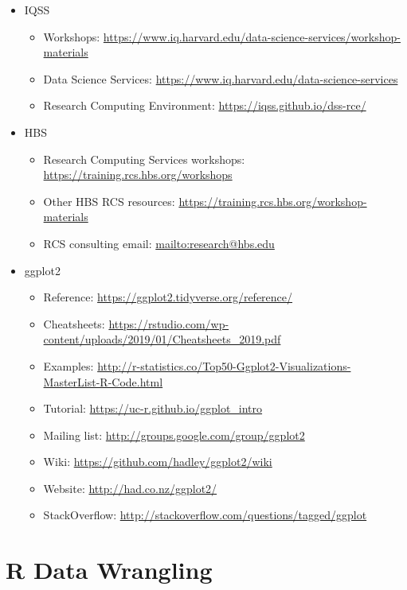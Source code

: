 \documentclass[
]{book}
\providecommand{\tightlist}{%
  \setlength{\itemsep}{0pt}\setlength{\parskip}{0pt}}
\begin{document}
\begin{itemize}
\tightlist
\item
  IQSS

  \begin{itemize}
  \tightlist
  \item
    Workshops: \url{https://www.iq.harvard.edu/data-science-services/workshop-materials}
  \item
    Data Science Services: \url{https://www.iq.harvard.edu/data-science-services}
  \item
    Research Computing Environment: \url{https://iqss.github.io/dss-rce/}
  \end{itemize}
\item
  HBS

  \begin{itemize}
  \tightlist
  \item
    Research Computing Services workshops: \url{https://training.rcs.hbs.org/workshops}
  \item
    Other HBS RCS resources: \url{https://training.rcs.hbs.org/workshop-materials}
  \item
    RCS consulting email: \url{mailto:research@hbs.edu}
  \end{itemize}
\item
  ggplot2

  \begin{itemize}
  \tightlist
  \item
    Reference: \url{https://ggplot2.tidyverse.org/reference/}
  \item
    Cheatsheets: \url{https://rstudio.com/wp-content/uploads/2019/01/Cheatsheets_2019.pdf}
  \item
    Examples: \url{http://r-statistics.co/Top50-Ggplot2-Visualizations-MasterList-R-Code.html}
  \item
    Tutorial: \url{https://uc-r.github.io/ggplot_intro}
  \item
    Mailing list: \url{http://groups.google.com/group/ggplot2}
  \item
    Wiki: \url{https://github.com/hadley/ggplot2/wiki}
  \item
    Website: \url{http://had.co.nz/ggplot2/}
  \item
    StackOverflow: \url{http://stackoverflow.com/questions/tagged/ggplot}
  \end{itemize}
\end{itemize}

\hypertarget{r-data-wrangling}{%
\chapter{R Data Wrangling}\label{r-data-wrangling}}
\end{document}
